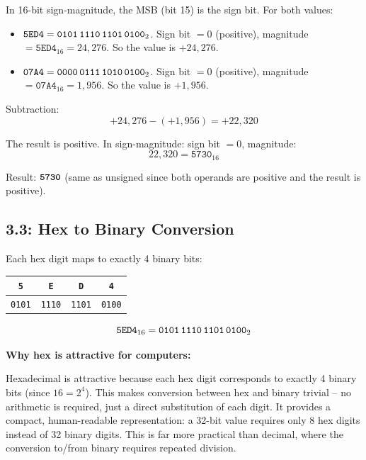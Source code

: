 In 16-bit sign-magnitude, the MSB (bit 15) is the sign bit. For both values:
\begin{itemize}
  \item $\texttt{5ED4} = \texttt{0101\,1110\,1101\,0100}_2$.
        Sign bit $= 0$ (positive), magnitude $= \texttt{5ED4}_{16} = 24{,}276$.
        So the value is $+24{,}276$.
  \item $\texttt{07A4} = \texttt{0000\,0111\,1010\,0100}_2$.
        Sign bit $= 0$ (positive), magnitude $= \texttt{07A4}_{16} = 1{,}956$.
        So the value is $+1{,}956$.
\end{itemize}

Subtraction:
\[ +24{,}276 - (+1{,}956) = +22{,}320 \]

The result is positive. In sign-magnitude: sign bit $= 0$, magnitude:
\[ 22{,}320 = \texttt{5730}_{16} \]

Result: $\textbf{\texttt{5730}}$ (same as unsigned since both operands are
positive and the result is positive).

\subsection*{3.3: Hex to Binary Conversion}
\hypertarget{sol-3.3}{}

Each hex digit maps to exactly 4 binary bits:

\begin{center}
\begin{tabular}{cccc}
\toprule
\texttt{5} & \texttt{E} & \texttt{D} & \texttt{4} \\
\midrule
\texttt{0101} & \texttt{1110} & \texttt{1101} & \texttt{0100} \\
\bottomrule
\end{tabular}
\end{center}

\[ \texttt{5ED4}_{16} = \texttt{0101\,1110\,1101\,0100}_2 \]

\medskip\noindent\textbf{Why hex is attractive for computers:}

Hexadecimal is attractive because each hex digit corresponds to exactly 4 binary
bits (since $16 = 2^4$). This makes conversion between hex and binary trivial --
no arithmetic is required, just a direct substitution of each digit. It provides
a compact, human-readable representation: a 32-bit value requires only 8 hex
digits instead of 32 binary digits. This is far more practical than decimal, where
the conversion to/from binary requires repeated division.

